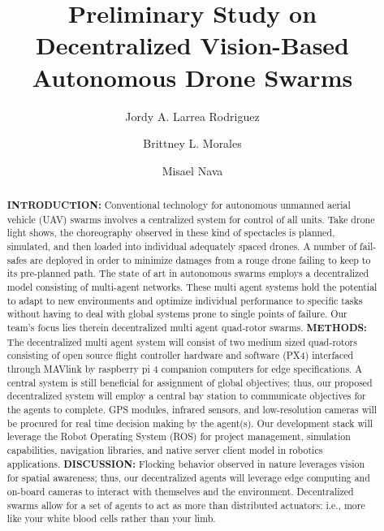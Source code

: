 \documentclass[%
 aip,
cp,  %
 amsmath,amssymb,%
 reprint,%
]{revtex4-2}
\begin{document}
\title{Preliminary Study on Decentralized Vision-Based Autonomous Drone Swarms}%

\author{Jordy A. Larrea Rodriguez} %

\author{Brittney L. Morales}%

\author{Misael Nava}

\begin{abstract}

\textbf{INTRODUCTION: } Conventional technology for autonomous unmanned aerial vehicle (UAV) swarms involves a centralized system for control of all units. Take drone light shows, the choreography observed in these kind of spectacles is planned, simulated, and then loaded into individual adequately spaced drones. A number of fail-safes are deployed in order to minimize damages from a rouge drone failing to keep to its pre-planned path. The state of art in autonomous swarms employs a decentralized model consisting of multi-agent networks. These multi agent systems hold the potential to adapt to new environments and optimize individual performance to specific tasks without having to deal with global systems prone to single points of failure. Our team's focus lies therein decentralized multi agent quad-rotor swarms.    
\newline\textbf{METHODS: } The decentralized multi agent system will consist of two medium sized quad-rotors consisting of open source flight controller hardware and software (PX4) interfaced through MAVlink by raspberry pi 4 companion computers for edge specifications. A central system is still beneficial for assignment of global objectives; thus, our proposed decentralized system will employ a central bay station to communicate objectives for the agents to complete. GPS modules, infrared sensors, and low-resolution cameras will be procured for real time decision making by the agent(s). Our development stack will leverage the Robot Operating System (ROS) for project management, simulation capabilities, navigation libraries, and native server client model in robotics applications.  
\newline\textbf{DISCUSSION: } Flocking behavior observed in nature leverages vision for spatial awareness; thus, our decentralized agents will leverage edge computing and on-board cameras to interact with themselves and the environment. Decentralized swarms allow for a set of agents to act as more than distributed actuators: i.e., more like your white blood cells rather than your limb. 

\end{abstract}
\end{document}
